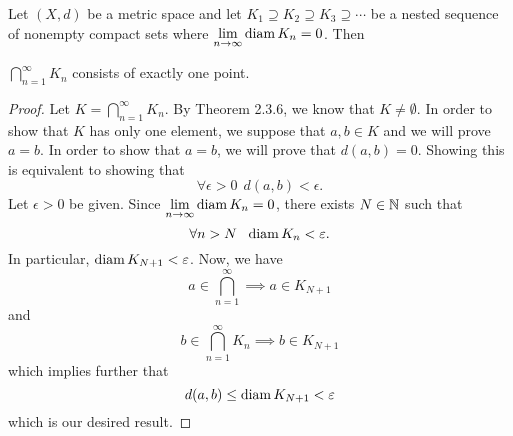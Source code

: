 \documentclass[a4paper]{article}
\begin{document}
\begin{theorem}[ ]
Let \( (X,d) \) be a metric space and let \( {K}_{1} \supseteq {K}_{2} \supseteq {K}_{3} \supseteq \cdots  \) be a nested sequence of nonempty compact sets where
\( \lim_{ n \to \infty  }  \diam {K}_{n} = 0  \). Then 
\begin{center}
    \( \bigcap_{ n=1  }^{ \infty  }  {K}_{n} \) consists of exactly one point.    
\end{center}
\end{theorem}
\begin{proof}
Let \( K = \bigcap_{ n=1  }^{ \infty  }  {K}_{n} \). By Theorem 2.3.6, we know that \( K \neq \emptyset \). In order to show that \( K  \) has only one element, we suppose that \( a,b \in K  \) and we will prove \( a = b \). In order to show that \( a = b  \), we will prove that \( d(a,b) = 0  \). Showing this is equivalent to showing that 
\[  \forall \epsilon > 0 \ \ d(a,b) < \epsilon.  \]
Let \( \epsilon > 0  \) be given. Since \( \lim_{ n \to \infty  }  \diam {K}_{n} = 0  \), there exists \( N \in \mathbb{N}  \) such that 
\[  \forall n > N  \ \ \diam {K}_{n} < \epsilon. \]
In particular, \( \operatorname{diam} {K}_{N+1} < \varepsilon \). Now, we have 
\[  a \in \bigcap_{ n=1  }^{ \infty  }  \implies a \in {K}_{N+1}  \]
and 
\[  b \in \bigcap_{ n=1  }^{ \infty  }  {K}_{n} \implies b \in {K}_{N+1}  \]
which implies further that 
\[  d(a,b) \leq \operatorname{diam} {K}_{N+1} < \varepsilon \]
which is our desired result.
\end{proof}
\end{document}
